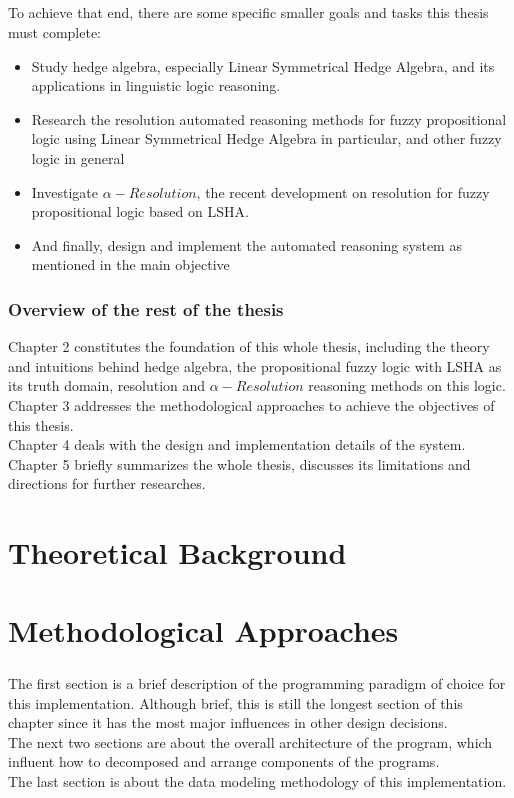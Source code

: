 \documentclass[../gr-final.tex]{subfiles}
\begin{document}
\paragraph{} To achieve that end, there are some specific smaller
goals and tasks this thesis must complete:
\begin{itemize}
        \item Study hedge algebra, especially Linear
        Symmetrical Hedge Algebra, and its applications in
        linguistic logic reasoning. 
        \item Research the resolution automated reasoning methods for
        fuzzy propositional logic using Linear Symmetrical Hedge
        Algebra in particular, and other fuzzy logic in general
        \item Investigate $\alpha-Resolution$, the recent
                development on resolution for fuzzy propositional
                logic based on LSHA.
        \item And finally, design and implement the automated
                reasoning system as mentioned in the main
                objective
\end{itemize}
\subsection{Overview of the rest of the thesis}
Chapter 2 constitutes the foundation of this
whole thesis, including the theory and intuitions behind hedge
algebra, the propositional fuzzy logic with LSHA as its truth
domain, resolution and $\alpha-Resolution$ reasoning methods on
this logic.\\
Chapter 3 addresses the methodological approaches to achieve the
objectives of this thesis.\\
Chapter 4 deals with the design and implementation details of the
system.\\
Chapter 5 briefly summarizes the whole thesis, discusses its
limitations and directions for further researches.
\chapter{Theoretical Background}




\chapter{Methodological Approaches} 
\paragraph{} The first section is a brief description of the
programming paradigm of choice for this implementation. Although
brief, this is still the longest section of this chapter since
it has the most major influences in other design decisions.\\
The next two sections are about the overall architecture of the
program, which influent how to decomposed and arrange components
of the programs.\\
The last section is about the data modeling methodology of this
implementation. 
\end{document}
